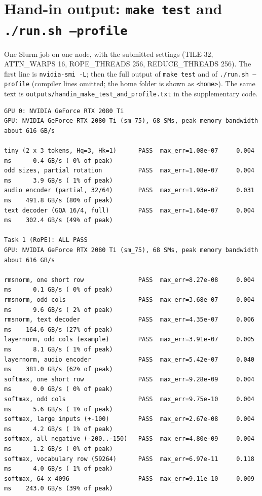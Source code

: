 \documentclass{article}
\begin{document}



\appendix
\section{Hand-in output: \texttt{make test} and \texttt{./run.sh --profile}}
\label{app:output}
One Slurm job on one node, with the submitted settings (TILE 32, ATTN\_WARPS 16, ROPE\_THREADS 256, REDUCE\_THREADS 256). The first line is \texttt{nvidia-smi -L}; then the full output of \texttt{make test} and of \texttt{./run.sh --profile} (compiler lines omitted; the home folder is shown as \texttt{<home>}). The same text is \texttt{outputs/handin\_make\_test\_and\_profile.txt} in the supplementary code.
{\fontsize{6.6}{7.7}\selectfont
\begin{verbatim}
GPU 0: NVIDIA GeForce RTX 2080 Ti
GPU: NVIDIA GeForce RTX 2080 Ti (sm_75), 68 SMs, peak memory bandwidth about 616 GB/s

tiny (2 x 3 tokens, Hq=3, Hk=1)      PASS  max_err=1.08e-07     0.004 ms      0.4 GB/s ( 0% of peak)
odd sizes, partial rotation          PASS  max_err=1.08e-07     0.004 ms      3.9 GB/s ( 1% of peak)
audio encoder (partial, 32/64)       PASS  max_err=1.93e-07     0.031 ms    491.8 GB/s (80% of peak)
text decoder (GQA 16/4, full)        PASS  max_err=1.64e-07     0.004 ms    302.4 GB/s (49% of peak)

Task 1 (RoPE): ALL PASS
GPU: NVIDIA GeForce RTX 2080 Ti (sm_75), 68 SMs, peak memory bandwidth about 616 GB/s

rmsnorm, one short row               PASS  max_err=8.27e-08     0.004 ms      0.1 GB/s ( 0% of peak)
rmsnorm, odd cols                    PASS  max_err=3.68e-07     0.004 ms      9.6 GB/s ( 2% of peak)
rmsnorm, text decoder                PASS  max_err=4.35e-07     0.006 ms    164.6 GB/s (27% of peak)
layernorm, odd cols (example)        PASS  max_err=3.91e-07     0.005 ms      8.1 GB/s ( 1% of peak)
layernorm, audio encoder             PASS  max_err=5.42e-07     0.040 ms    381.0 GB/s (62% of peak)
softmax, one short row               PASS  max_err=9.28e-09     0.004 ms      0.0 GB/s ( 0% of peak)
softmax, odd cols                    PASS  max_err=9.75e-10     0.004 ms      5.6 GB/s ( 1% of peak)
softmax, large inputs (+-100)        PASS  max_err=2.67e-08     0.004 ms      4.2 GB/s ( 1% of peak)
softmax, all negative (-200..-150)   PASS  max_err=4.80e-09     0.004 ms      1.2 GB/s ( 0% of peak)
softmax, vocabulary row (59264)      PASS  max_err=6.97e-11     0.118 ms      4.0 GB/s ( 1% of peak)
softmax, 64 x 4096                   PASS  max_err=9.11e-10     0.009 ms    243.0 GB/s (39% of peak)


\end{verbatim}}
\end{document}
